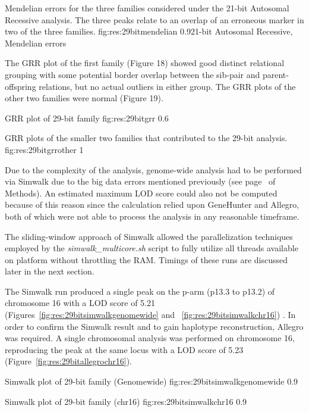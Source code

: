 	{Mendelian errors for the three families considered under the 21-bit Autosomal Recessive analysis. The three peaks relate to an overlap of an erroneous marker in two of the three families.}
	{fig:res:29bitmendelian}
	{0.9}{21-bit Autosomal Recessive, Mendelian errors}

The GRR plot of the first family (Figure 18) showed good distinct relational grouping with some potential border overlap between the sib-pair and parent-offspring relations, but no actual outliers in either group. The GRR plots of the other two families were normal (Figure 19).

\vfill
{}
	{GRR plot of 29-bit family}
	{fig:res:29bitgrr}
	{0.6}{}

	{GRR plots of the smaller two families that contributed to the 29-bit analysis.}
	{fig:res:29bitgrrother}
	{1}{}

Due to the complexity of the analysis, genome-wide analysis had to be performed via Simwalk due to the big data errors mentioned previously (see page~\pageref{ref:meth:allegrobigdata} of Methods).  An estimated maximum LOD score could also not be computed because of this reason since the calculation relied upon GeneHunter and Allegro, both of which were not able to process the analysis in any reasonable timeframe.

The sliding-window approach of Simwalk allowed the parallelization techniques employed by the \textit{simwalk\_multicore.sh} script to fully utilize all threads available on platform without throttling the RAM. Timings of these runs are discussed later in the next section.

The Simwalk run produced a single peak on the p-arm (p13.3 to p13.2) of chromosome 16 with a LOD score of 5.21 (Figures~\ref{fig:res:29bitsimwalkgenomewide} and ~\ref{fig:res:29bitsimwalkchr16}) . In order to confirm the Simwalk result and to gain haplotype reconstruction, Allegro was required. A single chromosomal analysis was performed on chromosome 16, reproducing the peak at the same locus  with a LOD score of 5.23 (Figure~\ref{fig:res:29bitallegrochr16}).

	{Simwalk plot of 29-bit family (Genomewide)}
	{fig:res:29bitsimwalkgenomewide}
	{0.9}{}

	{Simwalk plot of 29-bit family (chr16)}
	{fig:res:29bitsimwalkchr16}
	{0.9}{}
	
